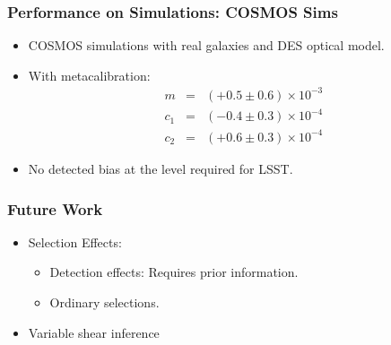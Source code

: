 \documentclass{beamer}
\newcommand{\mcal}{metacalibration}
\begin{document}
\frame
{
    \frametitle{Performance on Simulations: COSMOS Sims}

 
    \begin{itemize}
            
            

         \item COSMOS simulations with real galaxies and DES optical model.


         \item With \mcal:
        {\color{gold} 
            \begin{eqnarray}
                m & = & (+0.5 \pm 0.6) \times 10^{-3} \nonumber \\
              c_1 & = & (-0.4 \pm 0.3) \times 10^{-4} \nonumber \\
              c_2 & = & (+0.6 \pm 0.3) \times 10^{-4} \nonumber
            \end{eqnarray}
        }
         \item No detected bias at the level required for LSST.
    \end{itemize}

}



\frame
{
    \frametitle{Future Work}

 
    \begin{itemize}
            

         \item Selection Effects:
             \begin{itemize}
                 \item Detection effects:  Requires prior information.
                 \item Ordinary selections.  
             \end{itemize}

         \item Variable shear inference

    \end{itemize}

}
\end{document}
